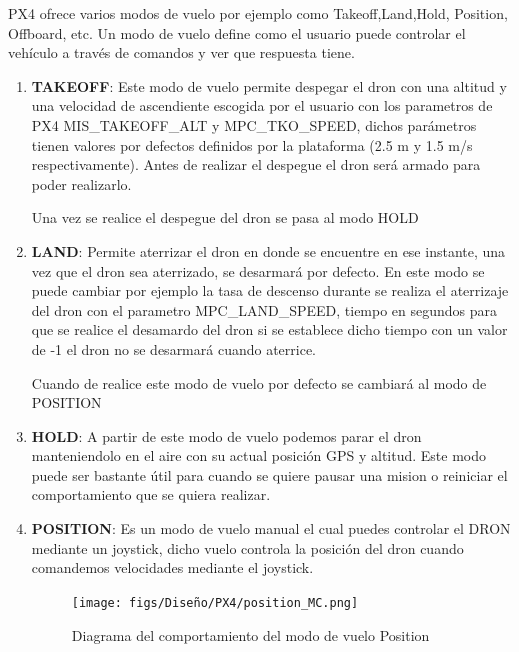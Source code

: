 PX4 ofrece varios modos de vuelo por ejemplo como Takeoff,Land,Hold, Position, Offboard, etc. Un modo de vuelo define como el usuario puede controlar el vehículo a través de comandos
  y ver que respuesta tiene. 


  \begin{enumerate}
    \item \textbf{TAKEOFF}: Este modo de vuelo permite despegar el dron con una altitud y una velocidad de ascendiente escogida por el usuario con los parametros de PX4 MIS\_TAKEOFF\_ALT y
    MPC\_TKO\_SPEED, dichos parámetros tienen valores por defectos definidos por la plataforma (2.5 m y 1.5 m/s respectivamente). Antes de realizar el despegue el dron será armado 
    para poder realizarlo.

    Una vez se realice el despegue del dron se pasa al modo HOLD 
    \item \textbf{LAND}: Permite aterrizar el dron en donde se encuentre en ese instante, una vez que el dron sea aterrizado, se desarmará por defecto. En este modo se puede cambiar por ejemplo
    la tasa de descenso durante se realiza el aterrizaje del dron con el parametro MPC\_LAND\_SPEED, tiempo en segundos para que se realice el desamardo del dron si se establece dicho tiempo
    con un valor de -1 el dron no se desarmará cuando aterrice.
    
    Cuando de realice este modo de vuelo por defecto se cambiará al modo de POSITION

    \item \textbf{HOLD}: A partir de este modo de vuelo podemos parar el dron manteniendolo en el aire con su actual posición GPS y altitud. Este modo puede ser bastante útil para cuando se quiere
    pausar una mision o reiniciar el comportamiento que se quiera realizar. 

    \item \textbf{POSITION}: Es un modo de vuelo manual el cual puedes controlar el DRON mediante un joystick, dicho vuelo controla la posición del dron cuando comandemos velocidades 
    mediante el joystick.

    \begin{figure} [H]
      \begin{center}
        \texttt{[image: figs/Diseño/PX4/position\_MC.png]}
      \end{center}
      \caption{Diagrama del comportamiento del modo de vuelo Position}
      \label{fig:position_mode_px4}
      \vspace{-1.5em}
    \end{figure}


\end{enumerate}
